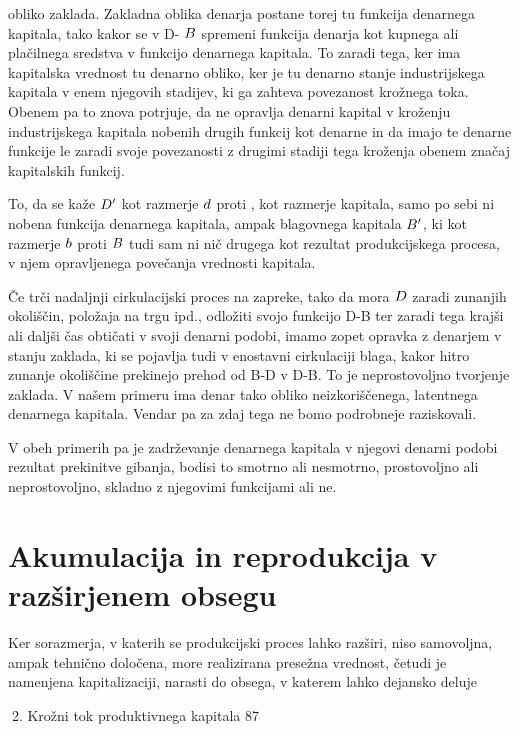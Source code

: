 \documentclass[kapital_02.tex]{subfiles}
\begin{document}
 obliko zaklada. Zakladna oblika denarja postane torej tu funkcija denarnega kapitala, tako kakor se v D- \( B \) spremeni funkcija denarja kot kupnega ali plačilnega sredstva v funkcijo denarnega kapitala. To zaradi tega, ker ima kapitalska vrednost tu denarno obliko, ker je tu denarno stanje industrijskega kapitala v enem njegovih stadijev, ki ga zahteva povezanost krožnega toka. Obenem pa to znova potrjuje, da ne opravlja denarni kapital v kroženju industrijskega kapitala nobenih drugih funkcij kot denarne in da imajo te denarne funkcije le zaradi svoje povezanosti z drugimi stadiji tega kroženja obenem značaj kapitalskih funkcij.

To, da se kaže \( D' \) kot razmerje \( d \) proti \KPED, kot razmerje kapitala, samo po sebi ni nobena funkcija denarnega kapitala, ampak blagovnega kapitala \( B' \), ki kot razmerje \( b \) proti \( B \) tudi sam ni nič drugega kot rezultat produkcijskega procesa, v njem opravljenega povečanja vrednosti kapitala.

Če trči nadaljnji cirkulacijski proces na zapreke, tako da mora \( D \) zaradi zunanjih okoliščin, položaja na trgu ipd., odložiti svojo funkcijo D-B ter zaradi tega krajši ali daljši čas obtičati v svoji denarni podobi, imamo zopet opravka z denarjem v stanju zaklada, ki se pojavlja tudi v enostavni cirkulaciji blaga, kakor hitro zunanje okoliščine prekinejo prehod od B-D v D-B. To je neprostovoljno tvorjenje zaklada. V našem primeru ima denar tako obliko neizkoriščenega, latentnega denarnega kapitala. Vendar pa za zdaj tega ne bomo podrobneje raziskovali.

V obeh primerih pa je zadrževanje denarnega kapitala v njegovi denarni podobi rezultat prekinitve gibanja, bodisi to smotrno ali nesmotrno, prostovoljno ali neprostovoljno, skladno z njegovimi funkcijami ali ne.

\section{Akumulacija in reprodukcija v razširjenem obsegu}

Ker sorazmerja, v katerih se produkcijski proces lahko razširi, niso samovoljna, ampak tehnično določena, more realizirana presežna vrednost, četudi je namenjena kapitalizaciji, narasti do obsega, v katerem lahko dejansko deluje



2. Krožni tok produktivnega kapitala 87
\end{document}
